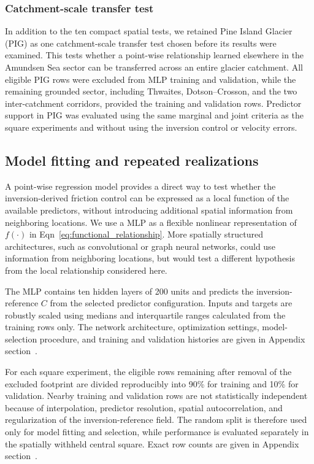 \documentclass[review,jog]{igs}
\begin{document}
\subsubsection{Catchment-scale transfer test}

In addition to the ten compact spatial tests, we retained Pine Island
Glacier (PIG) as one catchment-scale transfer test chosen before its results were examined. This tests whether a point-wise relationship
learned elsewhere in the Amundsen Sea sector can be transferred across an
entire glacier catchment. All eligible PIG rows were excluded
from MLP training and validation, while the remaining grounded sector,
including Thwaites, Dotson--Crosson, and the two inter-catchment corridors,
provided the training and validation rows. Predictor support in PIG was evaluated using the same marginal and joint
criteria as the square experiments and without using the inversion control
or velocity errors. 

\subsection{Model fitting and repeated realizations}

A point-wise regression model provides a direct way to test whether the
inversion-derived friction control can be expressed as a local function of the
available predictors, without introducing additional spatial information from
neighboring locations. We use a MLP as a
flexible nonlinear representation of $f(\cdot)$ in
Eqn~\ref{eq:functional_relationship}. More spatially structured architectures,
such as convolutional or graph neural networks, could use information from
neighboring locations, but would test a different hypothesis from the local
relationship considered here.

The MLP contains ten hidden layers of 200 units and predicts the
inversion-reference $C$ from the selected predictor configuration. Inputs and
targets are robustly scaled using medians and interquartile ranges calculated
from the training rows only. The network architecture, optimization settings,
model-selection procedure, and training and validation histories are given in Appendix
section~.

For each square experiment, the eligible rows remaining after removal of the
excluded footprint are divided reproducibly into 90\% for training and 10\%
for validation. Nearby training and validation rows are not statistically
independent because of interpolation, predictor resolution, spatial
autocorrelation, and regularization of the inversion-reference field. The
random split is therefore used only for model fitting and selection, while
performance is evaluated separately in the spatially withheld central square.
Exact row counts are given in Appendix
section~.
\end{document}
